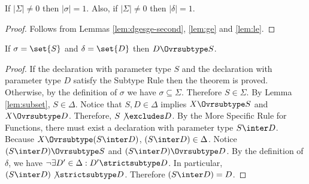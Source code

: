 \begin{theorem}
\label{thm:overloading-subtyping}
If $|\Sigma| \neq 0$ then $|\sigma| = 1$.  Also, if $|\Sigma| \neq 0$
then $|\delta| = 1$.
\end{theorem}

\begin{proof}
Follows from Lemmas \ref{lem:dgesge-second}, \ref{lem:ge} and \ref{lem:le}.
\end{proof}

\begin{theorem}
\label{thm:dynamic-subtype-static}
If $\sigma = \set{S}$ and $\delta = \set{D}$ then $D \Ovrsubtype S$.
\end{theorem}

\begin{proof}
If the declaration with parameter type $S$ and the declaration with
parameter type $D$ satisfy the Subtype Rule then the theorem is
proved.  Otherwise, by the definition of $\sigma$ we have $\sigma
\subseteq \Sigma$.  Therefore $S \in \Sigma$.  By Lemma
\ref{lem:subset}, $S \in \Delta$.  Notice that $S,D \in \Delta$ implies
$X \Ovrsubtype S$ and $X \Ovrsubtype D$.  Therefore, $S \not \excludes
D$.  By the More Specific Rule for Functions, there must exist a
declaration with parameter type $S \inter D$.  Because $X
\Ovrsubtype (S \inter D)$, $(S \inter D) \in \Delta$.
Notice $(S \inter D) \Ovrsubtype S$ and $(S \inter D) \Ovrsubtype D$.
By the definition of $\delta$, we have $\lnot \exists D'\in\Delta: D'
\strictsubtype D$.  In particular, $(S \inter D) \not \strictsubtype
D$.  Therefore $(S \inter D) = D$.
\end{proof}
